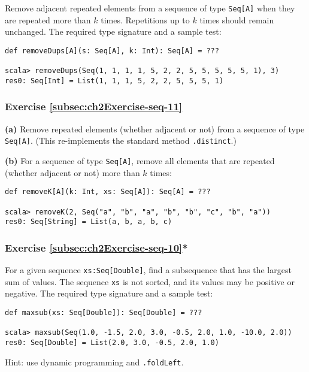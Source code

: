 Remove adjacent repeated elements from a sequence of type \lstinline!Seq[A]!
when they are repeated more than $k$ times. Repetitions up to $k$
times should remain unchanged. The required type signature and a sample
test:
\begin{lstlisting}
def removeDups[A](s: Seq[A], k: Int): Seq[A] = ???

scala> removeDups(Seq(1, 1, 1, 1, 5, 2, 2, 5, 5, 5, 5, 5, 1), 3)
res0: Seq[Int] = List(1, 1, 1, 5, 2, 2, 5, 5, 5, 1)
\end{lstlisting}

\subsubsection{Exercise \label{subsec:ch2Exercise-seq-11}\ref{subsec:ch2Exercise-seq-11}}

\textbf{(a)} Remove repeated elements (whether adjacent or not) from
a sequence of type \lstinline!Seq[A]!.
(This re-implements the standard method \lstinline!.distinct!.)

\textbf{(b)} For a sequence of type \lstinline!Seq[A]!,
remove all elements that are repeated (whether adjacent or not) more
than $k$ times:
\begin{lstlisting}
def removeK[A](k: Int, xs: Seq[A]): Seq[A] = ???

scala> removeK(2, Seq("a", "b", "a", "b", "b", "c", "b", "a"))
res0: Seq[String] = List(a, b, a, b, c)
\end{lstlisting}

\subsubsection{Exercise \label{subsec:ch2Exercise-seq-10}\ref{subsec:ch2Exercise-seq-10}{*}}

For a given sequence \lstinline!xs:Seq[Double]!,
find a subsequence that has the largest sum of values. The sequence
\lstinline!xs! is not sorted,
and its values may be positive or negative. The required type signature
and a sample test:
\begin{lstlisting}
def maxsub(xs: Seq[Double]): Seq[Double] = ???

scala> maxsub(Seq(1.0, -1.5, 2.0, 3.0, -0.5, 2.0, 1.0, -10.0, 2.0))
res0: Seq[Double] = List(2.0, 3.0, -0.5, 2.0, 1.0)
\end{lstlisting}
Hint: use dynamic programming and \lstinline!.foldLeft!.

